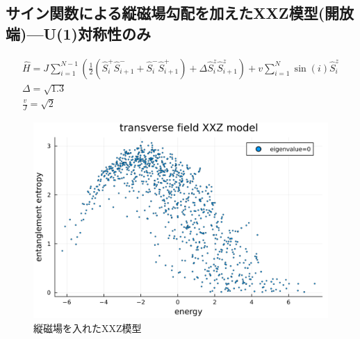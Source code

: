 \documentclass{ltjsarticle}
\begin{document}
\subsection*{サイン関数による縦磁場勾配を加えたXXZ模型(開放端)—U(1)対称性のみ}
\begin{gather}
  \hat{H}=J\sum_{i=1}^{N-1} \left(\frac{1}{2}(\hat{S}_i^+\hat{S}_{i+1}^- + \hat{S}_i^-\hat{S}_{i+1}^+) + \Delta\hat{S}_i^z\hat{S}_{i+1}^z\right) + v\sum_{i=1}^{N} \sin(i)\hat{S}_i^z\\
  \Delta=\sqrt{1.3}\\
  \frac{v}{J}=\sqrt{2}
\end{gather}
\begin{figure}[H]
  \centering
  \includegraphics[width=150mm]{entropy_xxz.png}
  \caption{縦磁場を入れたXXZ模型}
  \label{fig:entropy_xxz}
\end{figure}
\end{document}
